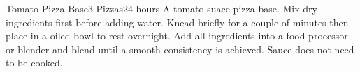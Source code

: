 \begin{recipe}[TomatoPizzaBase]{Tomato Pizza Base}{3 Pizzas}{24 hours}
    \freeform A tomato suace pizza base.
    Mix dry ingredients first before adding water. Knead briefly for a couple of minutes then place in a oiled bowl to rest overnight.
    Add all ingredients into a food processor or blender and blend until a smooth consistency is achieved. Sauce does not need to be cooked.
    \freeform\hrulefill
\end{recipe}